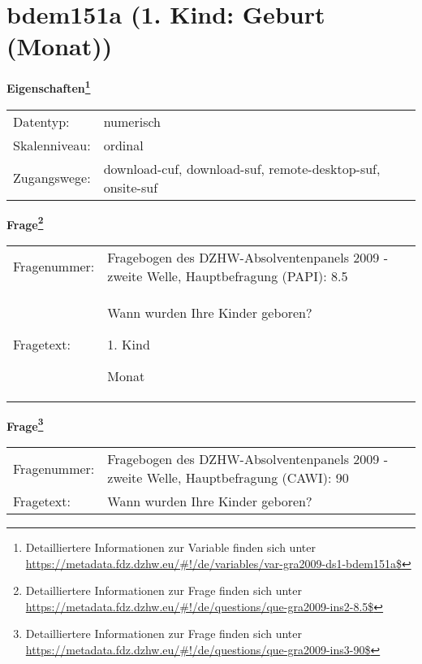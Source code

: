 
    \setcounter{footnote}{0}

    \vspace*{-1.8cm}
	\section{bdem151a (1. Kind: Geburt (Monat))}
	\label{section:bdem151a}



    \vspace*{0.5cm}
    \noindent\textbf{Eigenschaften\footnote{Detailliertere Informationen zur Variable finden sich unter
		\url{https://metadata.fdz.dzhw.eu/\#!/de/variables/var-gra2009-ds1-bdem151a$}}}\\
	\begin{tabularx}{\hsize}{@{}lX}
	Datentyp: & numerisch \\
	Skalenniveau: & ordinal \\
	Zugangswege: &
	  download-cuf, 
	  download-suf, 
	  remote-desktop-suf, 
	  onsite-suf
 \\
    \end{tabularx}



				\vspace*{0.5cm}
                \noindent\textbf{Frage\footnote{Detailliertere Informationen zur Frage finden sich unter
		              \url{https://metadata.fdz.dzhw.eu/\#!/de/questions/que-gra2009-ins2-8.5$}}}\\
				\begin{tabularx}{\hsize}{@{}lX}
					Fragenummer: &
					  Fragebogen des DZHW-Absolventenpanels 2009 - zweite Welle, Hauptbefragung (PAPI):
					  8.5
 \\
					Fragetext: & Wann wurden Ihre Kinder geboren?\par  1. Kind\par  Monat \\
				\end{tabularx}
				\vspace*{0.5cm}
                \noindent\textbf{Frage\footnote{Detailliertere Informationen zur Frage finden sich unter
		              \url{https://metadata.fdz.dzhw.eu/\#!/de/questions/que-gra2009-ins3-90$}}}\\
				\begin{tabularx}{\hsize}{@{}lX}
					Fragenummer: &
					  Fragebogen des DZHW-Absolventenpanels 2009 - zweite Welle, Hauptbefragung (CAWI):
					  90
 \\
					Fragetext: & Wann wurden Ihre Kinder geboren? \\
				\end{tabularx}






